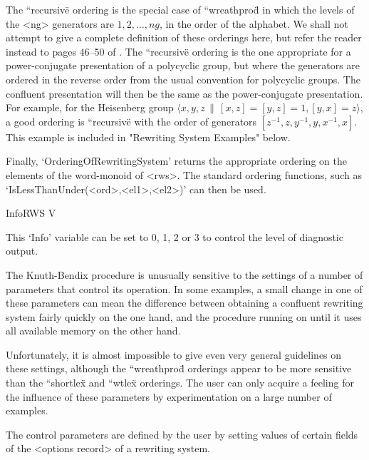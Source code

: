 The {``recursive\"} ordering is  the special case  of {``wreathprod\"}
in which the levels of the <ng> generators are $1,  2, \ldots, ng$, in
the order of the alphabet.  We shall not attempt
to give  a complete definition of  these orderings here, but refer the
reader instead to pages  46--50 of \cite{Sims94}.  The {``recursive\"}
ordering is the one appropriate  for a power-conjugate presentation of
a  polycyclic  group, but  where   the generators are  ordered  in the
reverse  order from the usual  convention  for polycyclic groups.  The
confluent  presentation will then  be the  same as the power-conjugate
presentation.  For example,  for the  Heisenberg  group $\langle x,y,z
\, \| \,  [x,z]=[y,z]=1,  [y,x]=z \rangle  $,   a
good   ordering  is {``recursive\"}  with    the  order of  generators
$[z^{-1},z,y^{-1},y,x^{-1},x]$.   This    example is     included   in
"Rewriting System Examples" below.

Finally, `OrderingOfRewritingSystem' returns the appropriate  {\GAP} ordering
on the elements of the word-monoid of <rws>. The standard {\GAP} ordering
functions, such as `IsLessThanUnder(<ord>,<el1>,<el2>)' can then be used.



\>InfoRWS V

This `Info' variable can be set to 0, 1, 2 or 3 to control the level
of diagnostic output.

The Knuth-Bendix procedure is unusually sensitive to the settings of a
number of parameters  that control its  operation. In some examples, a
small change  in   one of  these  parameters can  mean the  difference
between  obtaining a confluent  rewriting system fairly quickly on the
one hand, and  the  procedure running  on until it  uses all available
memory on the other hand.

Unfortunately, it is   almost  impossible to  give even  very  general
guidelines   on these   settings,  although the    {``wreathprod\"}
orderings appear to  be  more sensitive  than the {``shortlex\"}   and
{``wtlex\"} orderings.  The user  can  only acquire a  feeling for the
influence of these parameters by  experimentation on a large number of
examples.

The control  parameters are defined  by the user  by setting values of
certain fields of the <options record> of a rewriting system.

